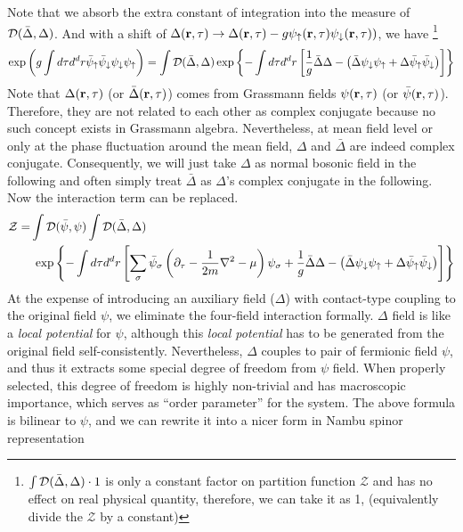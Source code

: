 Note that we absorb the extra constant of integration into the measure of $\mathcal{D}(\bar\Delta,\Delta)$.
And with a shift of $\Delta(\mathbf{r},\tau)\rightarrow\Delta(\mathbf{r},\tau)-g\psi_{\uparrow}(\mathbf{r},\tau)\psi_{\downarrow}(\mathbf{r},\tau))$, we have 
\footnote{$\int{\ensuremath{\mathcal{D}}(\bar\Delta,\Delta)}\cdot1$ is only a constant factor on partition function $\mathcal{Z}$ and has no effect on real physical quantity, therefore, we can take it as 1, (equivalently divide the $\mathcal{Z}$ by a constant)}
\begin{equation}
\exp\left(g\int{d\tau{}d^{d}r}\bar{\psi}_{\uparrow}\bar\psi_{\downarrow}\psi_{\downarrow}\psi_{\uparrow}\right)=
\int{\ensuremath{\mathcal{D}}(\bar\Delta,\Delta)}\exp\left\{-\int{d\tau{d^{d}r}}\left[\frac{1}{g}{\bar\Delta}{\Delta}-\left(\bar\Delta\psi_{\downarrow}\psi_{\uparrow}+\Delta\bar\psi_{\uparrow}\bar\psi_{\downarrow}\right)\right]\right\}
\end{equation}
Note that  $\Delta(\mathbf{r},\tau)$ (or $\bar\Delta(\mathbf{r},\tau)$) comes from  Grassmann fields $\psi(\mathbf{r},\tau)$ (or $\bar\psi(\mathbf{r},\tau)$). Therefore, they are not related to each other as complex conjugate because no such concept exists in Grassmann algebra.  Nevertheless, at mean field level or only at the phase fluctuation around the mean field, $\Delta$  and $\bar\Delta$ are indeed complex conjugate.  Consequently, we will just take $\Delta$  as normal bosonic field in the following and often simply treat $\bar\Delta$ as $\Delta$'s complex conjugate in the following. Now the interaction term can be replaced.
\begin{align*}
\mathcal{Z}=&\int{}\mathcal{D}(\bar\psi,\psi)\int{\ensuremath{\mathcal{D}}(\bar\Delta,\Delta)}\\
&\;\exp\left\{-\int{d\tau{d^{d}r}}\left[\sum_{\sigma}\bar\psi_{\sigma}\left(\partial_{\tau}-\frac{1}{2m}\nabla^{2}-\mu\right)\psi_{\sigma}+\frac{1}{g}{\bar\Delta}{\Delta}-\left(\bar\Delta\psi_{\downarrow}\psi_{\uparrow}+\Delta\bar\psi_{\uparrow}\bar\psi_{\downarrow}\right)\right]\right\}
\end{align*}
At the expense of introducing an auxiliary field ($\Delta$) with contact-type coupling to the original field $\psi$, we eliminate the four-field interaction formally.  $\Delta$ field is like a \emph{local potential} for $\psi$, although this \emph{local potential} has to be generated from the original field self-consistently.  Nevertheless, $\Delta$ couples to pair of fermionic field $\psi$, and thus it extracts some special degree of freedom from $\psi$ field.  When properly selected, this degree of freedom is highly non-trivial and has macroscopic importance, which serves as ``order parameter'' for the system.  The above formula is bilinear to $\psi$, and we can rewrite it into a nicer form in Nambu spinor representation
